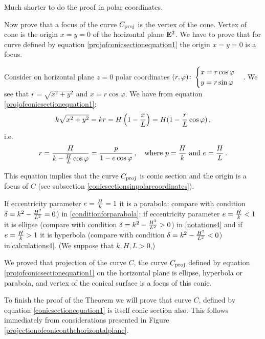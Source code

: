 \documentclass[12pt]{article}
\numberwithin{equation}{section}
\begin{document}
{\footnotesize
Much shorter to do the proof in polar coordinates.
 

Now prove that a focus of the curve 
$C_{\rm proj}$ is the vertex of the cone.
Vertex of cone is the  origin $x=y=0$
of the horizontal plane ${\bf E}^2$.
We have to prove that for curve defined by equation
\eqref{projofconicsectionequation1} 
the origin $x=y=0$
is a focus.

  Consider on horizontal plane
$z=0$ polar coordinates 
$(r,\varphi)\colon
\begin{cases}
x=r\cos\varphi\cr
y=r\sin\varphi\cr
\end{cases}$. We see that $r=\sqrt{x^2+y^2}$
and $x=r\cos\varphi$. We have from equation
\eqref{projofconicsectionequation1}:
        \begin{equation*}
k\sqrt{x^2+y^2}=kr=H\left(1-{x\over L}\right)=
H(1-{r\over L}\cos\varphi)\,,
        \end{equation*}
i.e.
        \begin{equation*}
r={H\over k-{H\over L}\cos\varphi}={p\over 1-e\cos\varphi}\,,
\quad {\rm where}\,\, p={H\over k}\,\, {\rm and}\,\,
e={H\over L}\,.
        \end{equation*}

 This equation implies that 
the curve $C_{\rm proj}$ is conic section and
the origin is a focus of $C$
(see subsection \eqref{conicsectionsinpolarcoordinates}).

If eccentricity parameter $e={H\over k}=1$ it is a parabola:
compare with condition 
$\delta=k^2-{H^2\over L^2}=0$)  
in \eqref{conditionforparabola};
if eccentricity parameter $e={H\over k}<1$ 
it is ellipse (compare with condition 
$\delta=k^2-{H^2\over L^2}>0$)
in \eqref{notations4}
and
if $e={H\over k}>1$ it is hyperbola 
(compare with condition 
$\delta=k^2-{H^2\over L^2}<0$)
in\eqref{calculations4}.
(We suppose that $k,H,L>0$,)

}

\m

We proved that projection of the curve
$C$, the curve $C_{\rm proj}$  
defined by equation \eqref{projofconicsectionequation1}
on the horizontal plane 
is ellipse, hyperbola or parabola, and vertex of the conical
surface is a focus of this conic.

To finish the proof of the Theorem we will prove 
that curve $C$,  defined by equation \eqref{conicsectionequation1}
is itself conic section also. This  follows
immediately from considerations presented in 
Figure \eqref{projectionofconiconthehorizontalplane}.
\end{document}
